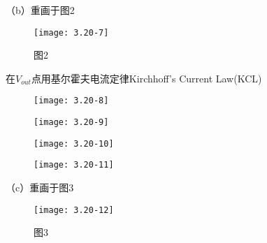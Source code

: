 \scalebox{3}{（b）}

（b）重画于图2


		\begin{figure}[H] %
	\begin{minipage}{\linewidth}
		\texttt{[image: 3.20-7]}
	\end{minipage}
	\caption*{图2} %
\end{figure}



在$V_{out}$点用基尔霍夫电流定律Kirchhoff’s Current Law(KCL)


		\begin{figure}[H] %
	\begin{minipage}{\linewidth}
		\texttt{[image: 3.20-8]}
	\end{minipage}
\end{figure}

\begin{figure}[H] %
	\begin{minipage}{\linewidth}
		\texttt{[image: 3.20-9]}
	\end{minipage}
\end{figure}

\begin{figure}[H] %
	\begin{minipage}{\linewidth}
		\texttt{[image: 3.20-10]}
	\end{minipage}
\end{figure}

\begin{figure}[H] %
	\begin{minipage}{\linewidth}
		\texttt{[image: 3.20-11]}
	\end{minipage}
\end{figure}















\scalebox{3}{（c）}

（c）重画于图3

		\begin{figure}[H] %
	\begin{minipage}{\linewidth}
		\texttt{[image: 3.20-12]}
	\end{minipage}
	\caption*{图3} %
\end{figure}




